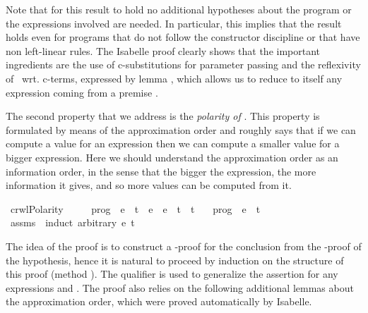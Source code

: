 \documentclass{llncs}
\newenvironment{isacode}
{\begin{list}{}{
\setlength{\leftmargin}{4pt}
\setlength{\rightmargin}{0pt}
\setlength{\listparindent}{0pt}\raggedright
\setlength{\itemsep}{0pt}
\setlength{\parsep}{0pt}
\normalfont\ttfamily }\item[]}
{\end{list}}
\begin{document}
Note that for this result to hold no additional hypotheses about the
program or the expressions involved are needed. In particular, this
implies that the result holds even for programs that do not follow the
constructor discipline or that have non left-linear rules. The
Isabelle proof clearly shows that the important ingredients are the
use of c-substitutions for parameter passing and the reflexivity of
\crwl\ wrt. c-terms, expressed by lemma , which
allows us to reduce to itself any expression 
coming from a premise .

\medskip

The second property that we address is the \emph{polarity of \crwl}.
This property is formulated by means of the approximation order and
roughly says that if we can compute a value for an expression then we
can compute a smaller value for a bigger expression. Here we should
understand the approximation order as an information order, in the
sense that the bigger the expression, the more information it gives,
and so more values can be computed from
it. 

\medskip

\begin{minipage}{\linewidth}
\begin{isacode}
\isamarkupfalse \ crwlPolarity\ {\isacharcolon}\ \isanewline
\ \ \ {\isachardoublequoteopen}prog\ {\isasymturnstile}\ e\ {\isasymrightarrow}\ t{\isachardoublequoteclose}\ \ {\isachardoublequoteopen}e\ {\isasymsqsubseteq}\ e{\isacharprime}{\isachardoublequoteclose}\ \ {\isachardoublequoteopen}t{\isacharprime}\ {\isasymsqsubseteq}\ t{\isachardoublequoteclose}\isanewline
\ \ \ {\isachardoublequoteopen}prog\ {\isasymturnstile}\ e{\isacharprime}\ {\isasymrightarrow}\ t{\isacharprime}{\isachardoublequoteclose}\isanewline
\isadelimproof
\endisadelimproof
\isatagproof
{}\isamarkupfalse \ assms\ \isamarkupfalse \ {\isacharparenleft}induct\ arbitrary{\isacharcolon}\ e{\isacharprime}\ t{\isacharprime}{\isacharparenright}
\end{isacode}
\end{minipage}

\medskip

\noindent The idea of the proof is to construct a \crwl-proof for the conclusion
from the \crwl-proof of the hypothesis, hence it is natural to proceed
by induction on the structure of this proof (method ).
The qualifier  is used to generalize the assertion
for any expressions  and . The proof also
relies on the following additional lemmas about the approximation
order, which were proved automatically by Isabelle.
\end{document}
